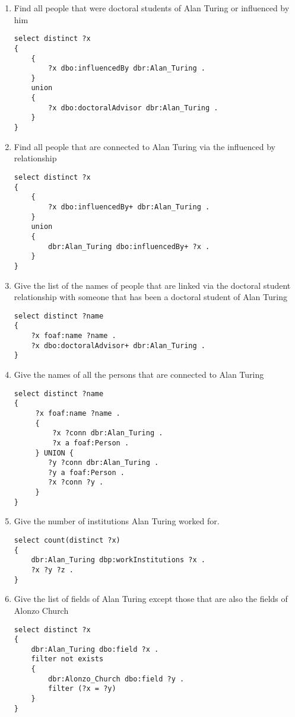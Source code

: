 \documentclass[a4paper, 12pt]{report}
\begin{document}
\begin{enumerate}
\item Find all people that were doctoral students of Alan Turing or influenced by him
\begin{lstlisting}[frame=single]
select distinct ?x
{
    {
        ?x dbo:influencedBy dbr:Alan_Turing .
    }
    union
    {
        ?x dbo:doctoralAdvisor dbr:Alan_Turing .
    }
}
\end{lstlisting}

\item Find all people that are connected to Alan Turing via the influenced by relationship
\begin{lstlisting}[frame=single]
select distinct ?x
{
    {
        ?x dbo:influencedBy+ dbr:Alan_Turing .
    }
    union
    {
        dbr:Alan_Turing dbo:influencedBy+ ?x .
    }
}
\end{lstlisting}

\item Give the list of the names of people that are linked via the doctoral student relationship with someone that has been a doctoral student of Alan Turing
\begin{lstlisting}[frame=single]
select distinct ?name
{
    ?x foaf:name ?name .
    ?x dbo:doctoralAdvisor+ dbr:Alan_Turing .
}
\end{lstlisting}

\item Give the names of all the persons that are connected to Alan Turing
\begin{lstlisting}[frame=single]
select distinct ?name  
{
     ?x foaf:name ?name .
     {
         ?x ?conn dbr:Alan_Turing .
         ?x a foaf:Person .
     } UNION {
        ?y ?conn dbr:Alan_Turing .
        ?y a foaf:Person .
        ?x ?conn ?y .
     }
}

\end{lstlisting}

\item Give the number of institutions Alan Turing worked for.
\begin{lstlisting}[frame=single]
select count(distinct ?x)
{
    dbr:Alan_Turing dbp:workInstitutions ?x .
    ?x ?y ?z .
}
\end{lstlisting}

\item Give the list of fields of Alan Turing except those that are also the fields of Alonzo Church
\begin{lstlisting}[frame=single]
select distinct ?x
{
    dbr:Alan_Turing dbo:field ?x .
    filter not exists 
    {
        dbr:Alonzo_Church dbo:field ?y .
        filter (?x = ?y)
    }
}
\end{lstlisting}


\end{enumerate}
\end{document}
